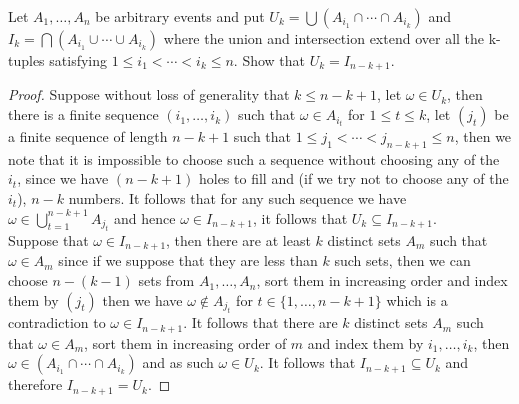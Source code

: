 \documentclass[11pt]{article}
\newcommand{\seq}{\subseteq}
\newcommand{\om}{\omega}
\newcommand{\un}{\cup}
\newcommand{\ic}{\cap}
\newenvironment{exercise}[2][Exercise]{\begin{trivlist}
\item[\hskip \labelsep {\bfseries #1}\hskip \labelsep {\bfseries #2.}]}{\end{trivlist}}
\begin{document}
\begin{exercise}{2.2}
    Let $A_1, \ldots, A_n$ be arbitrary events and put $U_k = \bigcup \left ( A_{i_1} \ic \cdots \ic A_{i_k} \right )$ and $I_k = \bigcap \left ( A_{i_1} \un \cdots \un A_{i_k} \right )$ where the union and intersection extend over all the k-tuples satisfying $1 \leq i_1 < \cdots < i_k \leq n$. Show that $U_k = I_{n-k+1}$.
\end{exercise}
\begin{proof}
    Suppose without loss of generality that $k \leq n-k+1$, let $\om \in U_k$, then there is a finite sequence $(i_1, \ldots, i_k)$ such that $\om \in A_{i_t}$ for $1 \leq t \leq k$, let $(j_t)$ be a finite sequence of length $n-k+1$ such that $1 \leq j_1 < \cdots < j_{n-k+1} \leq n$, then we note that it is impossible to choose such a sequence without choosing any of the $i_t$, since we have $(n-k+1)$ holes to fill and (if we try not to choose any of the $i_t$), $n-k$ numbers. It follows that for any such sequence we have $\om \in \bigcup_{t=1}^{n-k+1} A_{j_t}$ and hence $\om \in I_{n-k+1}$, it follows that $U_k \seq I_{n-k+1}$. \\
    Suppose that $\om \in I_{n-k+1}$, then there are at least $k$ distinct sets $A_m$ such that $\om \in A_m$ since if we suppose that they are less than $k$ such sets, then we can choose $n-(k-1)$ sets from $A_1, \ldots, A_n$, sort them in increasing order and index them by $(j_t)$ then we have $\om \notin A_{j_t}$ for $t \in \{ 1, \ldots, n-k+1 \}$ which is a contradiction to $\om \in I_{n-k+1}$. It follows that there are $k$ distinct sets $A_m$ such that $\om \in A_m$, sort them in increasing order of $m$ and index them by $i_1, \ldots, i_{k}$, then $\om \in (A_{i_1} \ic \cdots \ic A_{i_k})$ and as such $\om \in U_k$. It follows that $I_{n-k+1} \seq U_k$ and therefore $I_{n-k+1} = U_k$.
\end{proof}
\end{document}
